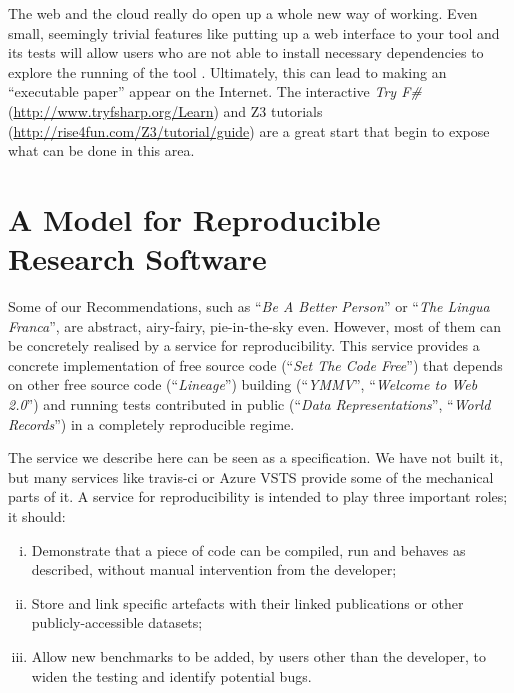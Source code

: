 \documentclass[a4paper,11pt]{article}
\begin{document}
 The web and the
cloud really do open up a whole new way of working. Even small,
seemingly trivial features like putting up a web interface to your
tool and its tests will allow users who are not able to install
necessary dependencies to explore the running of the tool
\cite{Hall2014}. Ultimately, this can lead to making an ``executable
paper'' appear on the Internet. The interactive {\em Try
F\#}(\url{http://www.tryfsharp.org/Learn}) and Z3
tutorials (\url{http://rise4fun.com/Z3/tutorial/guide}) are a
great start that begin to expose what can be done in this area.


\section{A Model for Reproducible Research Software}\label{sec:conclusion} 

Some of our Recommendations, such as ``{\emph{Be A Better Person}}''
or ``{\emph{The Lingua Franca}}'', are abstract, airy-fairy,
pie-in-the-sky even. However, most of them can be concretely realised
by a service for reproducibility. This service provides a concrete
implementation of free source code (``{\emph{Set The Code Free}}'')
that depends on other free source code (``{\emph{Lineage}}'') building
(``{\emph{YMMV}}'', ``{\emph{Welcome to Web 2.0}}'') and running tests
contributed in public (``{\emph{Data Representations}}'',
``{\emph{World Records}}'') in a completely reproducible regime.

The service we describe here can be seen as a specification. We have
not built it, but many services like travis-ci or Azure VSTS provide
some of the mechanical parts of it.  A service for reproducibility is
intended to play three important roles; it should:

\begin{enumerate}[i)]
\item Demonstrate that a piece of code can be compiled, run
and behaves as described, without manual intervention from the
developer;
\item Store and link specific artefacts with their linked
publications or other publicly-accessible datasets;
\item Allow new benchmarks to be added, by users other than
the developer, to widen the testing and identify potential bugs.
\end{enumerate}
\end{document}
